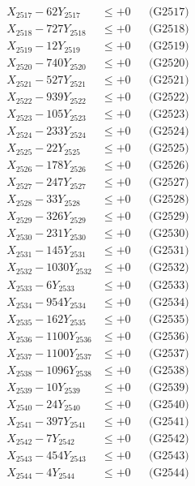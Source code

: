 \documentclass[a4paper,10pt]{article}
\begin{document}
{\begin{align}
X_{2517} - 62Y_{2517} &\leq +0 && \text{(G2517)} \\
X_{2518} - 727Y_{2518} &\leq +0 && \text{(G2518)} \\
X_{2519} - 12Y_{2519} &\leq +0 && \text{(G2519)} \\
X_{2520} - 740Y_{2520} &\leq +0 && \text{(G2520)} \\
\allowbreak
X_{2521} - 527Y_{2521} &\leq +0 && \text{(G2521)} \\
X_{2522} - 939Y_{2522} &\leq +0 && \text{(G2522)} \\
X_{2523} - 105Y_{2523} &\leq +0 && \text{(G2523)} \\
X_{2524} - 233Y_{2524} &\leq +0 && \text{(G2524)} \\
X_{2525} - 22Y_{2525} &\leq +0 && \text{(G2525)} \\
X_{2526} - 178Y_{2526} &\leq +0 && \text{(G2526)} \\
X_{2527} - 247Y_{2527} &\leq +0 && \text{(G2527)} \\
X_{2528} - 33Y_{2528} &\leq +0 && \text{(G2528)} \\
X_{2529} - 326Y_{2529} &\leq +0 && \text{(G2529)} \\
X_{2530} - 231Y_{2530} &\leq +0 && \text{(G2530)} \\
\allowbreak
X_{2531} - 145Y_{2531} &\leq +0 && \text{(G2531)} \\
X_{2532} - 1030Y_{2532} &\leq +0 && \text{(G2532)} \\
X_{2533} - 6Y_{2533} &\leq +0 && \text{(G2533)} \\
X_{2534} - 954Y_{2534} &\leq +0 && \text{(G2534)} \\
X_{2535} - 162Y_{2535} &\leq +0 && \text{(G2535)} \\
X_{2536} - 1100Y_{2536} &\leq +0 && \text{(G2536)} \\
X_{2537} - 1100Y_{2537} &\leq +0 && \text{(G2537)} \\
X_{2538} - 1096Y_{2538} &\leq +0 && \text{(G2538)} \\
X_{2539} - 10Y_{2539} &\leq +0 && \text{(G2539)} \\
X_{2540} - 24Y_{2540} &\leq +0 && \text{(G2540)} \\
\allowbreak
X_{2541} - 397Y_{2541} &\leq +0 && \text{(G2541)} \\
X_{2542} - 7Y_{2542} &\leq +0 && \text{(G2542)} \\
X_{2543} - 454Y_{2543} &\leq +0 && \text{(G2543)} \\
X_{2544} - 4Y_{2544} &\leq +0 && \text{(G2544)} \\

\end{align}}
\end{document}
